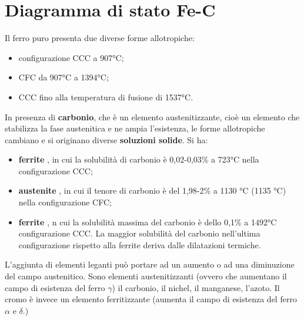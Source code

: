 \setchapterpreamble[u]{\margintoc}
\chapter{Diagramma di stato Fe-C}\label{Fe-C}

Il ferro puro presenta due diverse forme allotropiche:
\begin{itemize}
    \item configurazione CCC a 907°C;
    \item CFC da 907°C a 1394°C;
    \item CCC fino alla temperatura di fusione di 1537°C.
\end{itemize}

In presenza di \textbf{carbonio}, che è un elemento austenitizzante, cioè un elemento che stabilizza la fase austenitica e ne ampia l’esistenza, le forme allotropiche cambiano e si originano diverse \textbf{soluzioni solide}. Si ha:
\begin{itemize}
    \item \textbf{ferrite} \mathtext{\boldsymbol\alpha}, in cui la solubilità di carbonio è 0,02-0,03\% a 723°C nella configurazione CCC;
    \item \textbf{austenite} \mathtext{\boldsymbol\gamma},  in cui il tenore di carbonio è del 1,98-2\% a 1130 °C (1135 °C) nella configurazione CFC;
    \item \textbf{ferrite} \mathtext{\boldsymbol\delta}, n cui la solubilità massima del carbonio è dello 0,1\% a 1492°C configurazione CCC. La maggior solubilità del carbonio nell’ultima configurazione rispetto alla ferrite \mathtext{\alpha} deriva dalle dilatazioni termiche.
\end{itemize}

L'aggiunta di elementi leganti può portare ad un aumento o ad una diminuzione del campo austenitico. Sono elementi austenitizzanti (ovvero che aumentano il campo di esistenza del ferro $\gamma$) il carbonio, il nichel, il manganese, l'azoto. Il cromo è invece un elemento ferritizzante (aumenta il campo di esistenza del ferro $\alpha$ e $\delta$.)

